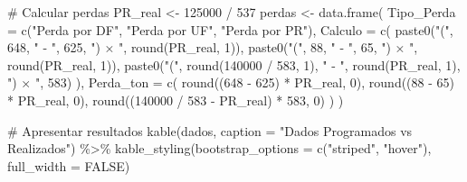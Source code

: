 \documentclass[
  letterpaper,
]{book}
\newenvironment{Shaded}{\begin{snugshade}}{\end{snugshade}}
\newcommand{\AttributeTok}[1]{\textcolor[rgb]{0.40,0.45,0.13}{#1}}
\newcommand{\CommentTok}[1]{\textcolor[rgb]{0.37,0.37,0.37}{#1}}
\newcommand{\ConstantTok}[1]{\textcolor[rgb]{0.56,0.35,0.01}{#1}}
\newcommand{\DecValTok}[1]{\textcolor[rgb]{0.68,0.00,0.00}{#1}}
\newcommand{\FunctionTok}[1]{\textcolor[rgb]{0.28,0.35,0.67}{#1}}
\newcommand{\NormalTok}[1]{\textcolor[rgb]{0.00,0.23,0.31}{#1}}
\newcommand{\OtherTok}[1]{\textcolor[rgb]{0.00,0.23,0.31}{#1}}
\newcommand{\SpecialCharTok}[1]{\textcolor[rgb]{0.37,0.37,0.37}{#1}}
\newcommand{\StringTok}[1]{\textcolor[rgb]{0.13,0.47,0.30}{#1}}
\begin{document}
\begin{Shaded}
\begin{Highlighting}[]
\CommentTok{\# Calcular perdas}
\NormalTok{PR\_real }\OtherTok{\textless{}{-}} \DecValTok{125000} \SpecialCharTok{/} \DecValTok{537}
\NormalTok{perdas }\OtherTok{\textless{}{-}} \FunctionTok{data.frame}\NormalTok{(}
    \AttributeTok{Tipo\_Perda =} \FunctionTok{c}\NormalTok{(}\StringTok{"Perda por DF"}\NormalTok{, }\StringTok{"Perda por UF"}\NormalTok{, }\StringTok{"Perda por PR"}\NormalTok{),}
    \AttributeTok{Calculo =} \FunctionTok{c}\NormalTok{(}
        \FunctionTok{paste0}\NormalTok{(}\StringTok{"("}\NormalTok{, }\DecValTok{648}\NormalTok{, }\StringTok{" {-} "}\NormalTok{, }\DecValTok{625}\NormalTok{, }\StringTok{") × "}\NormalTok{, }\FunctionTok{round}\NormalTok{(PR\_real, }\DecValTok{1}\NormalTok{)),}
        \FunctionTok{paste0}\NormalTok{(}\StringTok{"("}\NormalTok{, }\DecValTok{88}\NormalTok{, }\StringTok{" {-} "}\NormalTok{, }\DecValTok{65}\NormalTok{, }\StringTok{") × "}\NormalTok{, }\FunctionTok{round}\NormalTok{(PR\_real, }\DecValTok{1}\NormalTok{)),}
        \FunctionTok{paste0}\NormalTok{(}\StringTok{"("}\NormalTok{, }\FunctionTok{round}\NormalTok{(}\DecValTok{140000} \SpecialCharTok{/} \DecValTok{583}\NormalTok{, }\DecValTok{1}\NormalTok{), }\StringTok{" {-} "}\NormalTok{, }\FunctionTok{round}\NormalTok{(PR\_real, }\DecValTok{1}\NormalTok{), }\StringTok{") × "}\NormalTok{, }\DecValTok{583}\NormalTok{)}
\NormalTok{    ),}
    \AttributeTok{Perda\_ton =} \FunctionTok{c}\NormalTok{(}
        \FunctionTok{round}\NormalTok{((}\DecValTok{648} \SpecialCharTok{{-}} \DecValTok{625}\NormalTok{) }\SpecialCharTok{*}\NormalTok{ PR\_real, }\DecValTok{0}\NormalTok{),}
        \FunctionTok{round}\NormalTok{((}\DecValTok{88} \SpecialCharTok{{-}} \DecValTok{65}\NormalTok{) }\SpecialCharTok{*}\NormalTok{ PR\_real, }\DecValTok{0}\NormalTok{),}
        \FunctionTok{round}\NormalTok{((}\DecValTok{140000} \SpecialCharTok{/} \DecValTok{583} \SpecialCharTok{{-}}\NormalTok{ PR\_real) }\SpecialCharTok{*} \DecValTok{583}\NormalTok{, }\DecValTok{0}\NormalTok{)}
\NormalTok{    )}
\NormalTok{)}

\CommentTok{\# Apresentar resultados}
\FunctionTok{kable}\NormalTok{(dados, }\AttributeTok{caption =} \StringTok{"Dados Programados vs Realizados"}\NormalTok{) }\SpecialCharTok{\%\textgreater{}\%}
    \FunctionTok{kable\_styling}\NormalTok{(}\AttributeTok{bootstrap\_options =} \FunctionTok{c}\NormalTok{(}\StringTok{"striped"}\NormalTok{, }\StringTok{"hover"}\NormalTok{), }\AttributeTok{full\_width =} \ConstantTok{FALSE}\NormalTok{)}
\end{Highlighting}
\end{Shaded}
\end{document}
